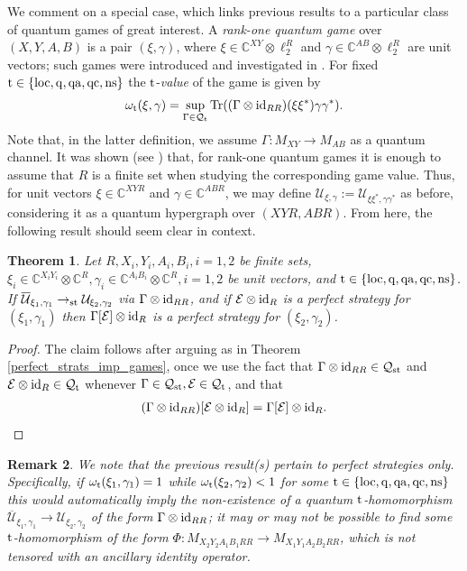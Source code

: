 \documentclass[11pt]{amsart}
\newtheorem{theorem}{Theorem}[section]
\newtheorem{remark}[theorem]{Remark}
\newcommand{\cl}[1]{\mathcal{#1}}
\newcommand{\bb}[1]{\mathbb{#1}}
\begin{document}
We comment on a special case, which links previous results to a particular class of quantum games of great interest. A \textit{rank-one quantum game} over $(X, Y, A, B)$ is a pair $(\xi, \gamma)$, where $\xi \in \bb{C}^{XY}\otimes \ell_{2}^{R}$ and $\gamma \in \bb{C}^{AB}\otimes \ell_{2}^{R}$ are unit vectors; such games were introduced and investigated in \cite{cjpp}. For fixed ${\rm t} \in \{\rm loc, q, qa, qc, ns\}$ the ${\rm t}$-\textit{value} of the game is given by
\begin{gather*}
	\omega_{\rm t}(\xi, \gamma) = \sup\limits_{\Gamma \in \cl{Q}_{\rm t}}{\rm Tr}((\Gamma\otimes {\rm id}_{RR})(\xi\xi^{*})\gamma\gamma^{*}).
\end{gather*}
\noindent Note that, in the latter definition, we assume $\Gamma: M_{XY}\rightarrow M_{AB}$ as a quantum channel. It was shown (see \cite[Proposition 3.1]{cjpp}) that, for rank-one quantum games it is enough to assume that $R$ is a finite set when studying the corresponding game value. Thus, for unit vectors $\xi \in \bb{C}^{XYR}$ and $\gamma \in \bb{C}^{ABR}$, we may define $\cl{U}_{\xi, \gamma} := \cl{U}_{\xi\xi^{*}, \gamma\gamma^{*}}$ as before, considering it as a quantum hypergraph over $(XYR, ABR)$. From here, the following result should seem clear in context.
\begin{theorem}
Let $R, X_{i}, Y_{i}, A_{i}, B_{i}, i = 1, 2$ be finite sets, $\xi_{i} \in \bb{C}^{X_{i}Y_{i}}\otimes \bb{C}^{R}, \gamma_{i} \in \bb{C}^{A_{i}B_{i}}\otimes \bb{C}^{R}, i = 1, 2$ be unit vectors, and ${\rm t} \in \{\rm loc, q, qa, qc, ns\}$. If $\overline{\cl{U}}_{\xi_{1}, \gamma_{1}}\rightarrow_{\rm st} \cl{U}_{\xi_{2}, \gamma_{2}}$ via $\Gamma\otimes {\rm id}_{RR}$, and if $\cl{E} \otimes {\rm id}_{R}$ is a perfect strategy for $(\xi_{1}, \gamma_{1})$ then $\Gamma[\cl{E}]\otimes {\rm id}_{R}$ is a perfect strategy for $(\xi_{2}, \gamma_{2})$. 
\end{theorem}
\begin{proof}
The claim follows after arguing as in Theorem \ref{perfect_strats_imp_games}, once we use the fact that $\Gamma\otimes {\rm id}_{RR} \in \cl{Q}_{\rm st}$ and $\cl{E}\otimes {\rm id}_{R} \in \cl{Q}_{\rm t}$ whenever $\Gamma \in \cl{Q}_{\rm st}, \cl{E} \in \cl{Q}_{\rm t}$, and that
\begin{gather*}
	(\Gamma\otimes {\rm id}_{RR})[\cl{E}\otimes {\rm id}_{R}] = \Gamma[\cl{E}]\otimes {\rm id}_{R}.
\end{gather*}
\end{proof}
\begin{remark}
\rm We note that the previous result(s) pertain to perfect strategies only. Specifically, if $\omega_{\rm t}(\xi_{1}, \gamma_{1}) = 1$ while $\omega_{\rm t}(\xi_{2}, \gamma_{2}) < 1$ for some ${\rm t} \in \{\rm loc, q, qa, qc, ns\}$ this would automatically imply the non-existence of a quantum ${\rm t}$-homomorphism $\overline{\cl{U}}_{\xi_{1}, \gamma_{1}}\rightarrow \cl{U}_{\xi_{2}, \gamma_{2}}$ of the form $\Gamma\otimes {\rm id}_{RR}$; it may or may not be possible to find some ${\rm t}$-homomorphism of the form $\Phi: M_{X_{2}Y_{2}A_{1}B_{1}RR}\rightarrow M_{X_{1}Y_{1}A_{2}B_{2}RR}$, which is not tensored with an ancillary identity operator. 
\end{remark}
\end{document}
